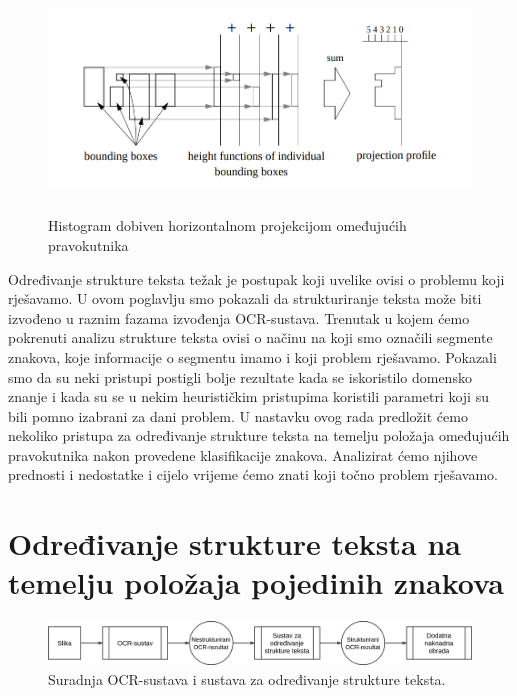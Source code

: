 \documentclass[times, utf8, zavrsni]{fer}
\begin{document}
\begin{figure}[htb]
    \centering
    \captionsetup{justification=centering,margin=2cm}
    \includegraphics[height=6cm]{images/histogram-projection.png}
    \caption{Histogram dobiven horizontalnom projekcijom omeđujućih pravokutnika \citep{liang1996document}}
    \label{fig:histogram-projection}
\end{figure}

Određivanje strukture teksta težak je postupak koji uvelike ovisi o problemu koji rješavamo. U ovom
poglavlju smo pokazali da strukturiranje teksta može biti izvođeno u raznim fazama izvođenja OCR-sustava.
Trenutak u kojem ćemo pokrenuti analizu strukture teksta ovisi o načinu na koji smo
označili segmente znakova, koje informacije o segmentu imamo i koji problem rješavamo.
Pokazali smo da su neki pristupi postigli bolje rezultate kada se iskoristilo domensko znanje
i kada su se u nekim heurističkim pristupima koristili parametri koji su bili pomno
izabrani za dani problem.
U nastavku ovog rada predložit ćemo nekoliko pristupa za određivanje strukture teksta na temelju položaja omeđujućih pravokutnika nakon provedene klasifikacije
znakova. Analizirat ćemo njihove prednosti i nedostatke i cijelo vrijeme ćemo znati koji točno problem rješavamo.
















\chapter{Određivanje strukture teksta na temelju položaja pojedinih znakova}
\begin{figure}[htb]
    \centering
    \captionsetup{justification=centering,margin=2cm}
    \includegraphics[width=\textwidth]{images/sustav-01.png}
    \caption{Suradnja OCR-sustava i sustava za određivanje strukture teksta.}
    \label{fig:sustav-01}
\end{figure}
\end{document}
